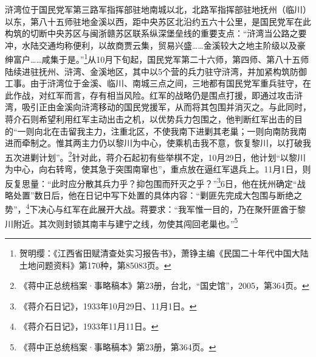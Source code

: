浒湾位于国民党军第三路军指挥部驻地南城以北，北路军指挥部驻地抚州（临川）以东，第八十五师驻地金溪以西，距中央苏区北沿约五六十公里，是国民党军在此构筑的切断中央苏区与闽浙赣苏区联系纵深堡垒线的重要支点：“浒湾当公路之要冲，水陆交通均称便利，以故商贾云集，贸易兴盛……金溪较大之地主阶级以及豪绅富户……咸集于是。”\footnote{贺明缨：《江西省田赋清查处实习报告书》，萧铮主编《民国二十年代中国大陆土地问题资料》第170种，第85083页。}从10月下旬起，国民党军第二十六师，第四师、第八十五师陆续进驻抚州、浒湾、金溪地区，其中以5个营的兵力驻守浒湾，并加紧构筑防御工事。由于浒湾位于金溪、临川、南城三点之间，三地都有国民党军重兵驻守，在此作战，对红军而言，存有相当风险。红军的战略仍是围点打援，即通过攻击浒湾，吸引正由金溪向浒湾移动的国民党援军，从而将其包围并消灭之。与此同时，蒋介石则希望利用红军主动出击之机，以优势兵力包围之，他判断红军出击的目的“一则向北在击留我主力，注重北区，不使我南下进剿其老巢；一则向南防我南进而牵制之。惟其两主力仍以黎川为中心，使乘机击我不意，恢复黎川，以打破我五次进剿计划”。\footnote{《蒋中正总统档案·事略稿本》第23册，台北，“国史馆”，2005，第364页。}针对此，蒋介石起初有些举棋不定，10月29日，他计划“以黎川为中心，向右转弯，使其急于突围南窜也”，重点放在逼红军退兵上。11月1日，则反复思量：“此时应分散其兵力乎？抑包围而歼灭之乎？”\footnote{《蒋介石日记》，1933年10月29日、11月1日。}6日，他在抚州确定“战略处置”数日后，他在日记中写下处置的具体内容：“剿匪先完成大包围与断绝之势”，\footnote{《蒋介石日记》，1933年11月11日。}下决心与红军在此展开大战。蒋要求：“我军惟一目的，乃在聚歼匪酋于黎川附近。其次则封锁其南丰与建宁之线，勿使其闯回老巢也。”\footnote{《蒋中正总统档案·事略稿本》第23册，第364页。}


